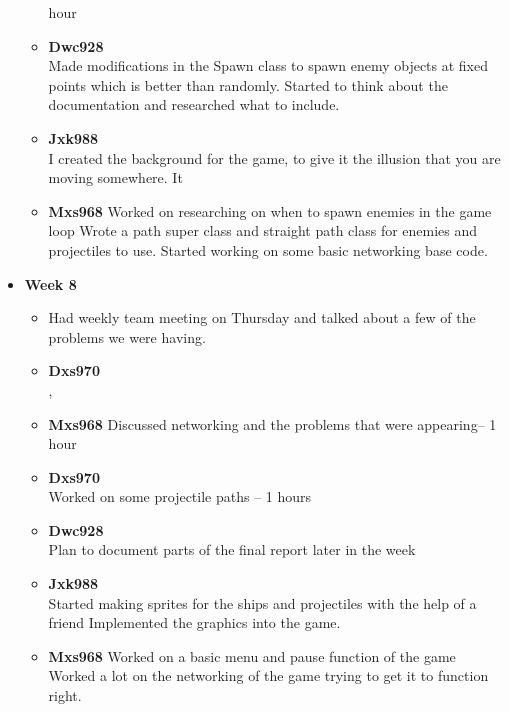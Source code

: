 \begin{itemize}
\begin{itemize}
    hour
  \item \textbf{Dwc928}\\
    Made modifications in the Spawn class to spawn enemy objects at
    fixed points which is better than randomly.  Started to think
    about the documentation and researched what to include.
  \item \textbf{Jxk988}\\
    I created the background for the game, to give it the illusion
    that you are moving somewhere. It
  \item \textbf{Mxs968} Worked on researching on when to spawn enemies
    in the game loop Wrote a path super class and straight path class
    for enemies and projectiles to use.  Started working on some basic
    networking base code.
  \end{itemize}
\item \textbf{Week 8}
  \begin{itemize}
  \item Had weekly team meeting on Thursday and talked about a few of
    the problems we were having.
  \item \textbf{Dxs970}\\,\item \textbf{Mxs968} Discussed networking
    and the problems that were appearing– 1 hour
  \item \textbf{Dxs970}\\
    Worked on some projectile paths – 1 hours
  \item \textbf{Dwc928}\\
    Plan to document parts of the final report later in the week
  \item \textbf{Jxk988}\\
    Started making sprites for the ships and projectiles with the help
    of a friend Implemented the graphics into the game.
  \item \textbf{Mxs968} Worked on a basic menu and pause function of
    the game Worked a lot on the networking of the game trying to get
    it to function right.
  \end{itemize}




\end{itemize}
